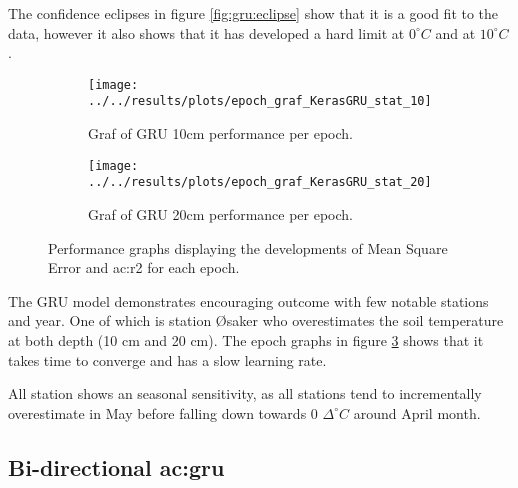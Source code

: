 The confidence eclipses in figure \ref{fig:gru:eclipse} show that it is a good fit to the data, however it also shows that it has developed a hard limit at $0^\circ C$ and at $10^\circ C$.

\begin{figure}
	\begin{subfigure}{0.45\textwidth}
		\centering
		\begin{adjustwidth}{-1in}{-1in}
			\texttt{[image: ../../results/plots/epoch\_graf\_KerasGRU\_stat\_10]}
		\end{adjustwidth}
		\caption[Epoch graph GRU 10cm]{Graf of GRU 10cm performance per epoch.}
		\label{fig:epochgrafKerasGRUstat10}
	\end{subfigure}
	\begin{subfigure}{0.45\textwidth}
		\centering
		\begin{adjustwidth}{-1in}{-1in}
			\texttt{[image: ../../results/plots/epoch\_graf\_KerasGRU\_stat\_20]}
		\end{adjustwidth}
		\caption[Epoch graph GRU 20cm]{Graf of GRU 20cm performance per epoch.}
		\label{fig:epochgrafKerasGRUstat20}
	\end{subfigure}
	\caption{Performance graphs displaying the developments of Mean Square Error and \acrfull{ac:r2} for each epoch.}
	\label{fig:gru:epoch}
\end{figure}

The GRU model demonstrates encouraging outcome with few notable stations and year. One of which is station Øsaker who overestimates the soil temperature at both depth (10 cm and 20 cm). The epoch graphs in figure \ref{fig:gru:epoch} shows that it takes time to converge and has a slow learning rate.

All station shows an seasonal sensitivity, as all stations tend to incrementally overestimate in May before falling down towards 0 $\Delta^\circ C$ around April month. 

\subsection{Bi-directional \acrfull{ac:gru}}

